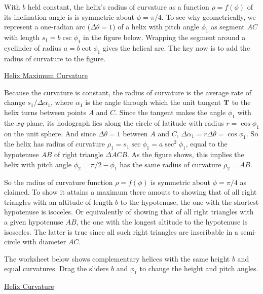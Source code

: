 \documentclass{ximera}
\begin{document}
With $b$ held constant, the helix's radius of curvature  as a function  $\rho=f(\phi)$ of its inclination angle is is symmetric about $\phi=\pi/4$. To see why geometrically, we represent a one-radian arc ($\Delta \theta=1$) of a helix with pitch angle $\phi_1$ as segment $AC$ with length $s_1 = b\csc\phi_1$ in the figure below. Wrapping the segment around a cyclinder of radius $a=b\cot\phi_1$ gives the helical arc. The key now is to add the radius of curvature to the figure.


\begin{onlineOnly}
    \begin{center}
\end{center}
\end{onlineOnly}

\href{https://www.desmos.com/calculator/f2sragdapj}{Helix Maximum Curvature}

Because the curvature is constant, the radius of curvature is the average rate of change $s_1 / \Delta \alpha_1$, where $\alpha_1$ is the angle through which the unit tangent ${\bf T}$ to the helix turns between points $A$ and $C$. Since the tangent makes the angle $\phi_1$ with the $xy$-plane, its hodograph lies along the circle of latitude with radius $r = \cos\phi_1$ on the unit sphere. And since $\Delta\theta= 1$ between $A$ and $C$, $\Delta \alpha_1 = r \Delta \theta = \cos\phi_1$. So the helix has radius of curvature $\rho_1 = s_1\sec\phi_1 = a \sec^2\phi_1$, equal to the hypotenuse $AB$ of right triangle $\Delta ACB$.  As the figure shows, this implies the helix with pitch angle $\phi_2 = \pi/2 - \phi_1$ has the same radius of curvature $\rho_2 = AB$.

So the radius of curvature function $\rho = f(\phi)$ is symmetric about $\phi=\pi/4$ as claimed. To show it attains a maximum there amouts to showing that of all right triangles with an altitude of length $b$ to the hypotenuse, the one with the shortest hypotenuse is isoceles. Or equivalently of showing that of all right triangles with a given hypotenuse $AB$, the one with the longest altitude to the hypotenuse is isosceles. The latter is true since all such right triangles are inscribable in a semi-circle with diameter $AC$. 


The worksheet below shows complementary helices with the same height $b$ and equal curvatures. Drag the sliders $b$ and $\phi_1$ to change the height and pitch angles.

\begin{onlineOnly}
    \begin{center}
\end{center}
\end{onlineOnly}

\href{https://www.desmos.com/3d/xq8nuuxbcb}{Helix  Curvature}
\end{document}
